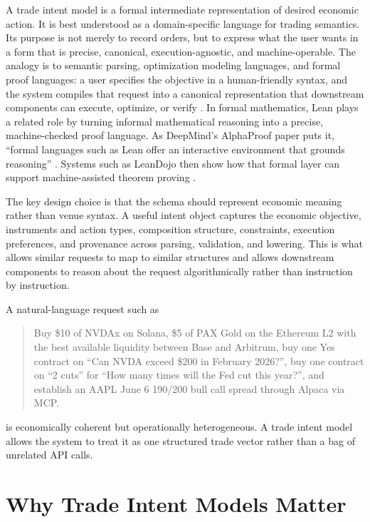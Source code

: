 \documentclass{article}
\begin{document}
A trade intent model is a formal intermediate representation of desired economic action. It is best understood as a domain-specific language for trading semantics. Its purpose is not merely to record orders, but to express what the user wants in a form that is precise, canonical, execution-agnostic, and machine-operable. The analogy is to semantic parsing, optimization modeling languages, and formal proof languages: a user specifies the objective in a human-friendly syntax, and the system compiles that request into a canonical representation that downstream components can execute, optimize, or verify \citep{kamath2018survey,diamond2016cvxpy,demoura2015lean}. In formal mathematics, Lean plays a related role by turning informal mathematical reasoning into a precise, machine-checked proof language. As DeepMind's AlphaProof paper puts it, ``formal languages such as Lean offer an interactive environment that grounds reasoning'' \citep[p.~607]{hubert2026alphaproof}. Systems such as LeanDojo then show how that formal layer can support machine-assisted theorem proving \citep{yang2023leandojo}.

The key design choice is that the schema should represent economic meaning rather than venue syntax. A useful intent object captures the economic objective, instruments and action types, composition structure, constraints, execution preferences, and provenance across parsing, validation, and lowering. This is what allows similar requests to map to similar structures and allows downstream components to reason about the request algorithmically rather than instruction by instruction.

A natural-language request such as
\begin{quote}
\small
Buy \$10 of NVDAx on Solana, \$5 of PAX Gold on the Ethereum L2 with the best available liquidity between Base and Arbitrum, buy one Yes contract on ``Can NVDA exceed \$200 in February 2026?'', buy one contract on ``2 cuts'' for ``How many times will the Fed cut this year?'', and establish an AAPL June 6 190/200 bull call spread through Alpaca via MCP.
\end{quote}
is economically coherent but operationally heterogeneous. A trade intent model allows the system to treat it as one structured trade vector rather than a bag of unrelated API calls.

\section{Why Trade Intent Models Matter}
\end{document}
